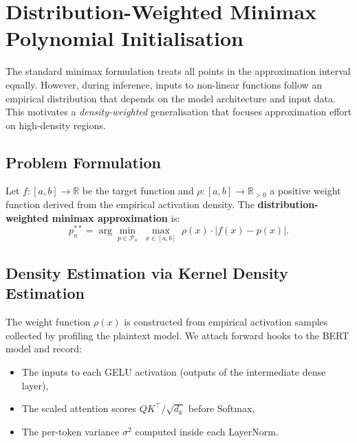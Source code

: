 
\section{Distribution-Weighted Minimax Polynomial Initialisation}
\label{sec:weighted_minimax}

The standard minimax formulation treats all points in the approximation interval equally. However, during inference, inputs to non-linear functions follow an empirical distribution that depends on the model architecture and input data. This motivates a \emph{density-weighted} generalisation that focuses approximation effort on high-density regions.

\subsection{Problem Formulation}

Let $f: [a, b] \to \mathbb{R}$ be the target function and $\rho: [a, b] \to \mathbb{R}_{>0}$ a positive weight function derived from the empirical activation density. The \textbf{distribution-weighted minimax approximation} is:
\begin{equation}
    p_n^{**} = \arg\min_{p \in \mathcal{P}_n}\; \max_{x \in [a,b]}\; \rho(x) \cdot |f(x) - p(x)|.
    \label{eq:weighted_minimax}
\end{equation}

\subsection{Density Estimation via Kernel Density Estimation}

The weight function $\rho(x)$ is constructed from empirical activation samples collected by profiling the plaintext model. We attach forward hooks to the BERT model and record:
\begin{itemize}
    \item The inputs to each GELU activation (outputs of the intermediate dense layer),
    \item The scaled attention scores $QK^\top / \sqrt{d_k}$ before Softmax,
    \item The per-token variance $\sigma^2$ computed inside each LayerNorm.
\end{itemize}

